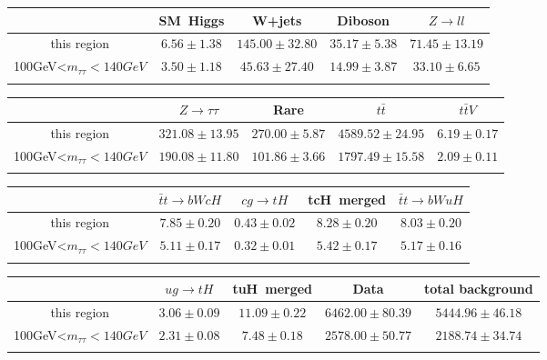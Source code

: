 \centering
\begin{tabular}{ccccc} \toprule\toprule
 & SM~Higgs & W+jets & Diboson & $Z\to ll$\\\midrule
this region & $6.56\pm1.38$ & $145.00\pm32.80$ & $35.17\pm5.38$ & $71.45\pm13.19$\\
100GeV<$m_{\tau\tau}<140GeV$ & $3.50\pm1.18$ & $45.63\pm27.40$ & $14.99\pm3.87$ & $33.10\pm6.65$\\
\bottomrule\bottomrule\\
\end{tabular}
\begin{tabular}{ccccc} \toprule\toprule
 & $Z\to \tau\tau$ & Rare & $t\bar{t}$ & $t\bar{t}V$\\\midrule
this region & $321.08\pm13.95$ & $270.00\pm5.87$ & $4589.52\pm24.95$ & $6.19\pm0.17$\\
100GeV<$m_{\tau\tau}<140GeV$ & $190.08\pm11.80$ & $101.86\pm3.66$ & $1797.49\pm15.58$ & $2.09\pm0.11$\\
\bottomrule\bottomrule\\
\end{tabular}
\begin{tabular}{ccccc} \toprule\toprule
 & $\bar{t}t\to bWcH$ & $cg\to tH$ & tcH~merged & $\bar{t}t\to bWuH$\\\midrule
this region & $7.85\pm0.20$ & $0.43\pm0.02$ & $8.28\pm0.20$ & $8.03\pm0.20$\\
100GeV<$m_{\tau\tau}<140GeV$ & $5.11\pm0.17$ & $0.32\pm0.01$ & $5.42\pm0.17$ & $5.17\pm0.16$\\
\bottomrule\bottomrule\\
\end{tabular}
\begin{tabular}{ccccc} \toprule\toprule
 & $ug\to tH$ & tuH~merged & Data & total background\\\midrule
this region & $3.06\pm0.09$ & $11.09\pm0.22$ & $6462.00\pm80.39$ & $5444.96\pm46.18$\\
100GeV<$m_{\tau\tau}<140GeV$ & $2.31\pm0.08$ & $7.48\pm0.18$ & $2578.00\pm50.77$ & $2188.74\pm34.74$\\
\bottomrule\bottomrule\\
\end{tabular}
